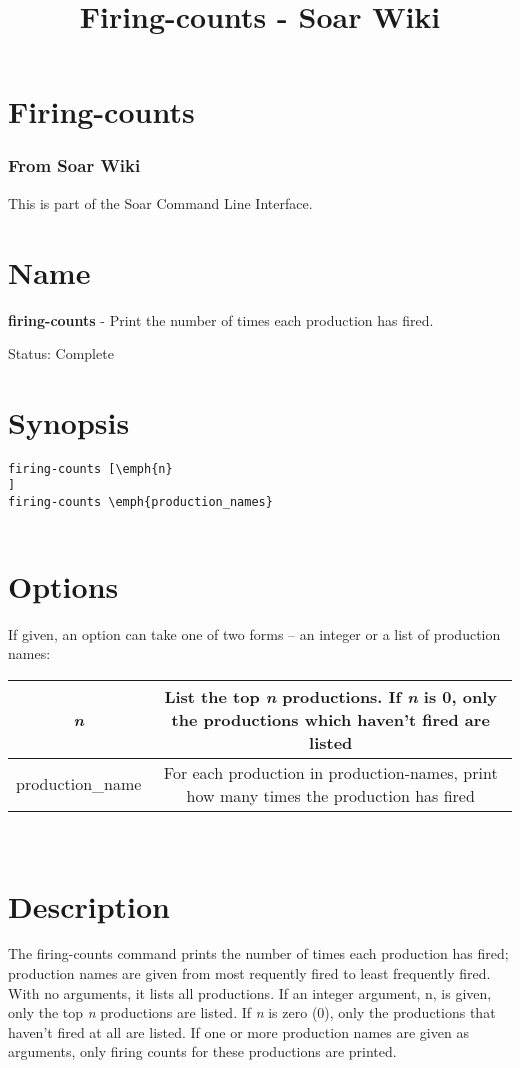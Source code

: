 \documentclass[10pt]{article}
\title{Firing-counts - Soar Wiki}
\begin{document}
\section*{Firing-counts}
\subsubsection*{From Soar Wiki}


 This is part of the Soar Command Line Interface. 
\section*{ Name }


 \textbf{firing-counts}
 - Print the number of times each production has fired. 


 Status: Complete
\section*{ Synopsis }
\begin{verbatim}
firing-counts [\emph{n}
]
firing-counts \emph{production_names}


\end{verbatim}
\section*{ Options }


 If given, an option can take one of two forms -- an integer or a list of production names: 

\begin{tabular}{|c|c|}
\hline 
\emph{n}
 & List the top \emph{n}
 productions. If \emph{n}
 is 0, only the productions which haven't fired are listed  \\
 \hline 
 production\_name  & For each production in production-names, print how many times the production has fired  \\
 \hline 

\end{tabular}




 \\ 

\section*{ Description }


 The firing-counts command prints the number of times each production has fired; production names are given from most requently fired to least frequently fired. With no arguments, it lists all productions. If an integer argument, n, is given, only the top \emph{n}
 productions are listed. If \emph{n}
 is zero (0), only the productions that haven't fired at all are listed. If one or more production names are given as arguments, only firing counts for these productions are printed. 
\end{document}
